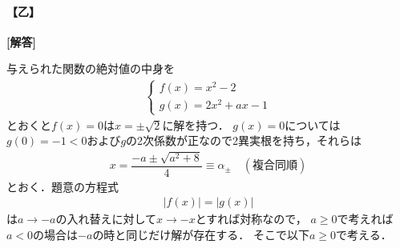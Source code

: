 \documentclass[../../main.tex]{subfiles}
\begin{document}
\begin{oframed}
  
\end{oframed}

\paragraph{【乙】}

{\bf [解答]}

与えられた関数の絶対値の中身を
\begin{align}
  \begin{cases}
    f(x)=x^2-2 \\
    g(x)=2x^2+ax-1
  \end{cases} \label{eq:1}
\end{align}
とおくと$f(x)=0$は$x=\pm\sqrt{2}$に解を持つ．
$g(x)=0$については$g(0)=-1<0$および$g$の2次係数が正なので2異実根を持ち，それらは
\begin{align}
  x=\dfrac{-a\pm\sqrt{a^2+8}}{4} \equiv \alpha_{\pm} \quad (\text{複合同順}) \label{eq:2}
\end{align}
とおく．題意の方程式
\begin{align}
  |f(x)| = |g(x)| \label{eq:3}
\end{align}
は$a\to -a$の入れ替えに対して$x\to -x$とすれば対称なので，
$a \ge 0$で考えれば$a <0$の場合は$-a$の時と同じだけ解が存在する．
そこで以下$a \ge 0$で考える．
\end{document}
